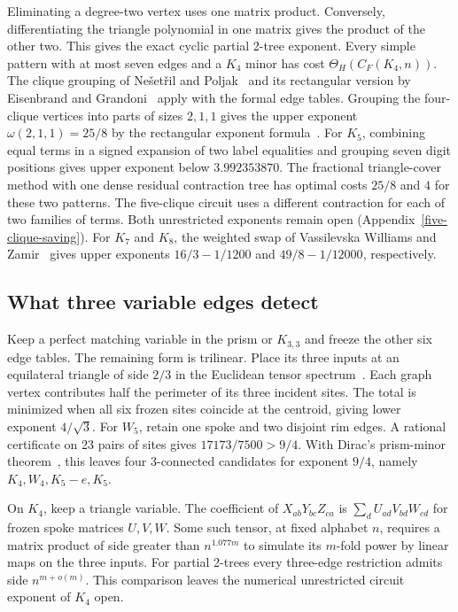\documentclass[11pt,letterpaper]{article}
\begin{document}
Eliminating a degree-two vertex uses one matrix product. Conversely,
differentiating the triangle polynomial in one matrix gives the product of the other two.
This gives the exact cyclic partial 2-tree exponent. Every simple pattern with at most
seven edges and a \(K_4\) minor has cost \(\Theta_H(C_F(K_4,n))\).
The clique grouping of Ne\v{s}et\v{r}il and Poljak~\cite{nesetril-poljak} and its rectangular version by Eisenbrand and Grandoni~\cite[Theorem~1]{eisenbrand-grandoni} apply with the formal edge tables.
Grouping the four-clique vertices into parts of sizes \(2,1,1\) gives
the upper exponent \(\omega(2,1,1)=25/8\) by the rectangular exponent formula~\cite{matrix-exponent}.
For \(K_5\), combining equal terms in a signed expansion of two label equalities
and grouping seven digit positions gives upper exponent below \(3.992353870\). The fractional triangle-cover method with one
dense residual contraction tree has optimal costs \(25/8\) and \(4\) for these
two patterns. The five-clique circuit uses a different contraction for each of
two families of terms. Both unrestricted exponents remain open
(Appendix~\ref{five-clique-saving}). For \(K_7\) and \(K_8\), the weighted swap of Vassilevska Williams and Zamir~\cite[Section~3]{vw-zamir}
gives upper exponents \(16/3-1/1200\) and \(49/8-1/12000\), respectively.

\subsection{What three variable edges detect}

Keep a perfect matching variable in the prism or \(K_{3,3}\) and freeze the other
six edge tables. The remaining form is trilinear. Place its three inputs at
an equilateral triangle of side \(2/3\) in the Euclidean tensor
spectrum~\cite[Theorem~1.1]{euclid}. Each graph vertex contributes half the
perimeter of its three incident sites. The total is minimized when all six
frozen sites coincide at the centroid, giving lower exponent \(4/\sqrt3\).
For \(W_5\), retain one spoke and two disjoint rim edges. A rational certificate
on 23 pairs of sites gives \(17173/7500>9/4\).
With Dirac's prism-minor theorem~\cite{dirac-structure}, this leaves four 3-connected candidates for
exponent \(9/4\), namely \(K_4,W_4,K_5-e,K_5\).

On \(K_4\), keep a triangle variable. The coefficient of
\(X_{ab}Y_{bc}Z_{ca}\) is \(\sum_d U_{ad}V_{bd}W_{cd}\) for frozen spoke
matrices \(U,V,W\). Some such tensor, at fixed alphabet \(n\), requires a
matrix product of side greater than \(n^{1.077m}\) to simulate its \(m\)-fold
power by linear maps on the three inputs. For partial 2-trees every three-edge
restriction admits side \(n^{m+o(m)}\). This comparison leaves the numerical
unrestricted circuit exponent of \(K_4\) open.
\end{document}
